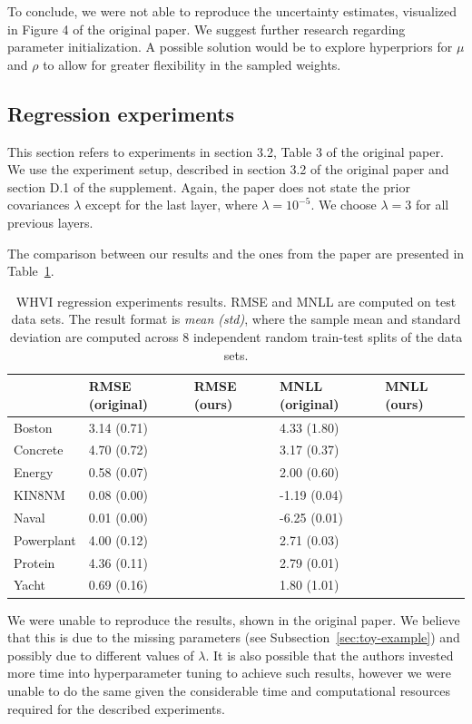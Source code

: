 \documentclass[11pt, twocolumn]{article}
\begin{document}
    To conclude, we were not able to reproduce the uncertainty estimates, visualized in Figure 4 of the original paper.
    We suggest further research regarding parameter initialization.
    A possible solution would be to explore hyperpriors for $\mu$ and $\rho$ to allow for greater flexibility in the sampled weights.

    \subsection{Regression experiments}
    This section refers to experiments in section 3.2, Table 3 of the original paper.
    We use the experiment setup, described in section 3.2 of the original paper and section D.1 of the supplement.
    Again, the paper does not state the prior covariances $\lambda$ except for the last layer, where $\lambda = 10^{-5}$.
    We choose $\lambda = 3$ for all previous layers.

    The comparison between our results and the ones from the paper are presented in Table~\ref{tab:regression-experiments}.
    \begin{table}[]
    \begin{tabular}{l|llll}
               & RMSE (original) & RMSE (ours) & { }MNLL (original) & MNLL (ours) \\ \hline
    Boston     & 3.14 (0.71)     &             & { }4.33 (1.80)     &             \\
    Concrete   & 4.70 (0.72)     &             & { }3.17 (0.37)     &             \\
    Energy     & 0.58 (0.07)     &             & { }2.00 (0.60)     &             \\
    KIN8NM     & 0.08 (0.00)     &             & -1.19 (0.04)       &             \\
    Naval      & 0.01 (0.00)     &             & -6.25 (0.01)       &             \\
    Powerplant & 4.00 (0.12)     &             & { }2.71 (0.03)     &             \\
    Protein    & 4.36 (0.11)     &             & { }2.79 (0.01)     &             \\
    Yacht      & 0.69 (0.16)     &             & { }1.80 (1.01)     &
    \end{tabular}
    \caption{WHVI regression experiments results. RMSE and MNLL are computed on test data sets. The result format is \textit{mean (std)}, where the sample mean and standard deviation are computed across 8 independent random train-test splits of the data sets.}
    \label{tab:regression-experiments}
    \end{table}
    We were unable to reproduce the results, shown in the original paper.
    We believe that this is due to the missing parameters (see Subsection~\ref{sec:toy-example}) and possibly due to different values of $\lambda$.
    It is also possible that the authors invested more time into hyperparameter tuning to achieve such results, however we were unable to do the same given the considerable time and computational resources required for the described experiments.
\end{document}
